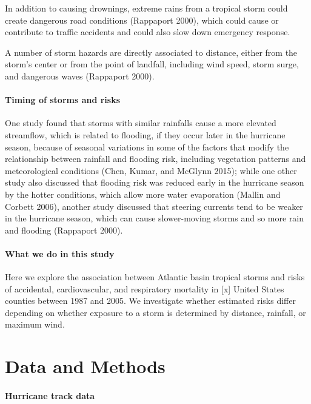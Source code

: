 \documentclass[]{elsarticle} %
\begin{document}
In addition to causing drownings, extreme rains from a tropical storm
could create dangerous road conditions (Rappaport 2000), which could
cause or contribute to traffic accidents and could also slow down
emergency response.

A number of storm hazards are directly associated to distance, either
from the storm's center or from the point of landfall, including wind
speed, storm surge, and dangerous waves (Rappaport 2000).

\paragraph{Timing of storms and risks}\label{timing-of-storms-and-risks}

One study found that storms with similar rainfalls cause a more elevated
streamflow, which is related to flooding, if they occur later in the
hurricane season, because of seasonal variations in some of the factors
that modify the relationship between rainfall and flooding risk,
including vegetation patterns and meteorological conditions (Chen,
Kumar, and McGlynn 2015); while one other study also discussed that
flooding risk was reduced early in the hurricane season by the hotter
conditions, which allow more water evaporation (Mallin and Corbett
2006), another study discussed that steering currents tend to be weaker
in the hurricane season, which can cause slower-moving storms and so
more rain and flooding (Rappaport 2000).

\paragraph{What we do in this study}\label{what-we-do-in-this-study}

Here we explore the association between Atlantic basin tropical storms
and risks of accidental, cardiovascular, and respiratory mortality in
{[}x{]} United States counties between 1987 and 2005. We investigate
whether estimated risks differ depending on whether exposure to a storm
is determined by distance, rainfall, or maximum wind.

\section{Data and Methods}\label{data-and-methods}

\paragraph{Hurricane track data}\label{hurricane-track-data}
\end{document}
